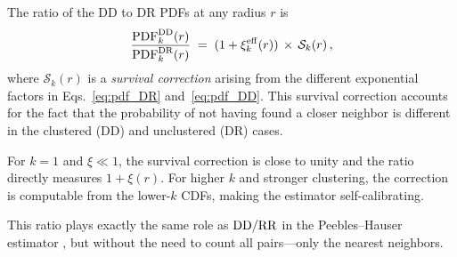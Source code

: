 The ratio of the DD to DR PDFs at any radius $r$ is
\begin{equation}
  \frac{\mathrm{PDF}^{\mathrm{DD}}_k(r)}{\mathrm{PDF}^{\mathrm{DR}}_k(r)} \;=\; (1 + \xi_k^{\rm eff}(r))\,\times\,\mathcal{S}_k(r)\,,
  \label{eq:ratio}
\end{equation}
where $\mathcal{S}_k(r)$ is a \emph{survival correction} arising from the different exponential factors in Eqs.~\eqref{eq:pdf_DR} and~\eqref{eq:pdf_DD}.  This survival correction accounts for the fact that the probability of not having found a closer neighbor is different in the clustered (DD) and unclustered (DR) cases.

For $k = 1$ and $\xi \ll 1$, the survival correction is close to unity and the ratio directly measures $1 + \xi(r)$.  For higher $k$ and stronger clustering, the correction is computable from the lower-$k$ CDFs, making the estimator self-calibrating.

This ratio plays exactly the same role as $\mathrm{DD}/\mathrm{RR}$ in the Peebles--Hauser estimator \citep{Peebles1974,DavisHuchra1982}, but without the need to count all pairs---only the nearest neighbors.
